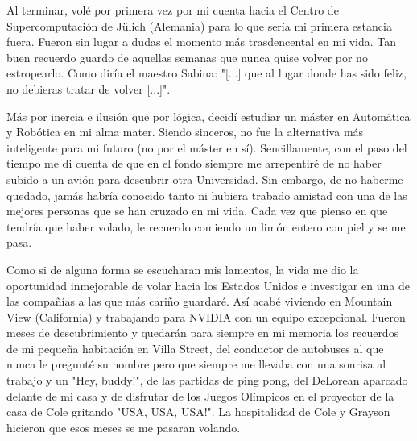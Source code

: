 Al terminar, volé por primera vez por mi cuenta hacia el Centro de Supercomputación de Jülich (Alemania) para lo que sería mi primera estancia fuera. Fueron sin lugar a dudas el momento más trasdencental en mi vida. Tan buen recuerdo guardo de aquellas semanas que nunca quise volver por no estropearlo. Como diría el maestro Sabina: "[...] que al lugar donde has sido feliz, no debieras tratar de volver [...]".

Más por inercia e ilusión que por lógica, decidí estudiar un máster en Automática y Robótica en mi alma mater. Siendo sinceros, no fue la alternativa más inteligente para mi futuro (no por el máster en sí). Sencillamente, con el paso del tiempo me di cuenta de que en el fondo siempre me arrepentiré de no haber subido a un avión para descubrir otra Universidad. Sin embargo, de no haberme quedado, jamás habría conocido tanto ni hubiera trabado amistad con una de las mejores personas que se han cruzado en mi vida. Cada vez que pienso en que tendría que haber volado, le recuerdo comiendo un limón entero con piel y se me pasa.

Como si de alguna forma se escucharan mis lamentos, la vida me dio la oportunidad inmejorable de volar hacia los Estados Unidos e investigar en una de las compañías a las que más cariño guardaré. Así acabé viviendo en Mountain View (California) y trabajando para NVIDIA con un equipo excepcional. Fueron meses de descubrimiento y quedarán para siempre en mi memoria los recuerdos de mi pequeña habitación en Villa Street, del conductor de autobuses al que nunca le pregunté su nombre pero que siempre me llevaba con una sonrisa al trabajo y un "Hey, buddy!", de las partidas de ping pong, del DeLorean aparcado delante de mi casa y de disfrutar de los Juegos Olímpicos en el proyector de la casa de Cole gritando "USA, USA, USA!". La hospitalidad de Cole y Grayson hicieron que esos meses se me pasaran volando.

